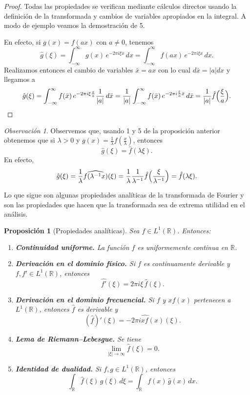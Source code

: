 \documentclass[12pt, a4paper]{amsbook}
\newcommand{\R}{{\mathbb R}}
\newtheorem{prop}[teo]{Proposición}
\theoremstyle{remark}
\newtheorem{obs}[teo]{Observación}
\theoremstyle{definition}
\numberwithin{section}{chapter}
\numberwithin{subsection}{section}
\numberwithin{equation}{section}
\numberwithin{figure}{chapter}
\begin{document}
\begin{proof}
Todas las propiedades se verifican mediante cálculos directos usando la definición de la transformada y cambios de variables apropiados en la integral. A modo de ejemplo veamos la demostración de 5.

En efecto, si $g(x)=f(ax)$ con $a\neq 0$, tenemos
$$
\hat g(\xi) = \int_{-\infty}^\infty g(x)\, e^{-2\pi i \xi x}\, dx = \int_{-\infty}^\infty f(ax)\, e^{-2\pi i \xi x}\, dx.
$$
Realizamos entonces el cambio de variables $\bar x = ax$ con lo cual $d\bar x = |a|dx$ y llegamos a
$$
\hat g(\xi) = \int_{-\infty}^\infty f(\bar x)\, e^{-2\pi i \xi \frac{\bar x}{a}} \frac{1}{|a|}\, d\bar x = \frac{1}{|a|}\int_{-\infty}^\infty f(\bar x)\, e^{-2\pi i \frac{\xi}{a} \bar x}\, d\bar x = \frac{1}{|a|} \hat f\Bigl(\frac{\xi}{a}\Bigr).
$$
\end{proof}

\begin{obs}\label{rescale}
Observemos que, usando 1 y 5 de la proposición anterior obtenemos que si $\lambda>0$ y $g(x)=\frac{1}{\lambda} f(\frac{x}{\lambda})$, entonces
$$
\hat g(\xi) = \hat f(\lambda\xi).
$$
En efecto,
$$
\hat g(\xi) = \frac{1}{\lambda} \widehat{f(\lambda^{-1}x)}(\xi) = \frac{1}{\lambda} \frac{1}{\lambda^{-1}}\hat f\Bigl(\frac{\xi}{\lambda^{-1}}\Bigr) = \hat f(\lambda \xi).
$$
\end{obs}

Lo que sigue son algunas propiedades analíticas de la transformada de Fourier y son las propiedades que hacen que la transformada sea de extrema utilidad en el análisis.

\begin{prop}[Propiedades analíticas]\label{prop.analiticas}
Sea $f\in L^1(\R)$. Entonces:
\begin{enumerate}
\item \textbf{Continuidad uniforme.}  
La función $\hat f$ es uniformemente continua en $\R$.

\item \textbf{Derivación en el dominio físico.}  
Si $f$ es continuamente derivable y $f,f'\in L^1(\R)$, entonces
\[
\widehat{f'}(\xi)=2\pi i \xi\,\hat f(\xi).
\]

\item \textbf{Derivación en el dominio frecuencial.}  
Si $f$ y $x f(x)$ pertenecen a $L^1(\R)$, entonces $\hat f$ es derivable y
\[
(\hat f)'(\xi)=\widehat{-2\pi i x f(x)}(\xi).
\]

\item \textbf{Lema de Riemann--Lebesgue.}  
Se tiene
\[
\lim_{|\xi|\to\infty}\hat f(\xi)=0.
\]

\item \textbf{Identidad de dualidad.}  
Si $f,g\in L^1(\R)$, entonces
\[
\int_{\R}\hat f(\xi)\,g(\xi)\,d\xi
=
\int_{\R} f(x)\,\hat g(x)\,dx.
\]
\end{enumerate}
\end{prop}
\end{document}
